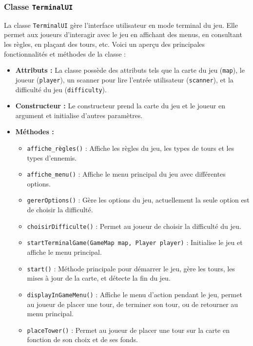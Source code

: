 \documentclass{article}
\begin{document}
\subsubsection{Classe \texttt{TerminalUI}}
La classe \texttt{TerminalUI} gère l'interface utilisateur en mode terminal du jeu. Elle permet aux joueurs d'interagir avec le jeu en affichant des menus, en consultant les règles, en plaçant des tours, etc. Voici un aperçu des principales fonctionnalités et méthodes de la classe :

\begin{itemize}
    \item \textbf{Attributs :} La classe possède des attributs tels que la carte du jeu (\texttt{map}), le joueur (\texttt{player}), un scanner pour lire l'entrée utilisateur (\texttt{scanner}), et la difficulté du jeu (\texttt{difficulty}).

    \item \textbf{Constructeur :} Le constructeur prend la carte du jeu et le joueur en argument et initialise d'autres paramètres.

    \item \textbf{Méthodes :}
    \begin{itemize}
        \item \texttt{affiche\_règles()} : Affiche les règles du jeu, les types de tours et les types d'ennemis.
        \item \texttt{affiche\_menu()} : Affiche le menu principal du jeu avec différentes options.
        \item \texttt{gererOptions()} : Gère les options du jeu, actuellement la seule option est de choisir la difficulté.
        \item \texttt{choisirDifficulte()} : Permet au joueur de choisir la difficulté du jeu.
        \item \texttt{startTerminalGame(GameMap map, Player player)} : Initialise le jeu et affiche le menu principal.
        \item \texttt{start()} : Méthode principale pour démarrer le jeu, gère les tours, les mises à jour de la carte, et détecte la fin du jeu.
        \item \texttt{displayInGameMenu()} : Affiche le menu d'action pendant le jeu, permet au joueur de placer une tour, de terminer son tour, ou de retourner au menu principal.
        \item \texttt{placeTower()} : Permet au joueur de placer une tour sur la carte en fonction de son choix et de ses fonds.
    \end{itemize}
\end{itemize}
\end{document}
